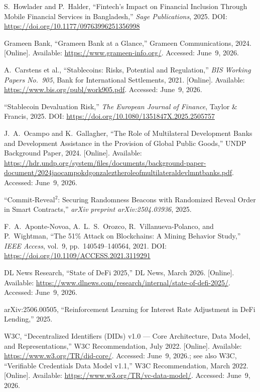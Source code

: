 \documentclass[12pt,a4paper]{report}
\begin{document}
{\begin{enumerate}[label={[\arabic*]}]
\item S.~Howlader and P.~Halder, ``Fintech's Impact on Financial Inclusion Through Mobile Financial Services in Bangladesh,'' \textit{Sage Publications}, 2025. DOI: \url{https://doi.org/10.1177/09763996251356998}

\item Grameen Bank, ``Grameen Bank at a Glance,'' Grameen Communications, 2024. [Online]. Available: \url{https://www.grameen-info.org/}. Accessed: June~9, 2026.
\item A.~Carstens et al., ``Stablecoins: Risks, Potential and Regulation,'' \textit{BIS Working Papers No.~905}, Bank for International Settlements, 2021. [Online]. Available: \url{https://www.bis.org/publ/work905.pdf}. Accessed: June~9, 2026.

\item ``Stablecoin Devaluation Risk,'' \textit{The European Journal of Finance}, Taylor \& Francis, 2025. DOI: \url{https://doi.org/10.1080/1351847X.2025.2505757}

\item J.~A.~Ocampo and K.~Gallagher, ``The Role of Multilateral Development Banks and Development Assistance in the Provision of Global Public Goods,'' UNDP Background Paper, 2024. [Online]. Available: \url{https://hdr.undp.org/system/files/documents/background-paper-document/2024jaocampokdgonzaleztheroleofmultilateraldevlmntbanks.pdf}. Accessed: June~9, 2026.

\item ``Commit-Reveal$^2$: Securing Randomness Beacons with Randomized Reveal Order in Smart Contracts,'' \textit{arXiv preprint arXiv:2504.03936}, 2025.

\item F.~A.~Aponte-Novoa, A.~L.~S.~Orozco, R.~Villanueva-Polanco, and P.~Wightman, ``The 51\% Attack on Blockchains: A Mining Behavior Study,'' \textit{IEEE Access}, vol.~9, pp.~140549--140564, 2021. DOI: \url{https://doi.org/10.1109/ACCESS.2021.3119291}
\item DL News Research, ``State of DeFi 2025,'' DL News, March 2026. [Online]. Available: \url{https://www.dlnews.com/research/internal/state-of-defi-2025/}. Accessed: June~9, 2026.
\item arXiv:2506.00505, ``Reinforcement Learning for Interest Rate Adjustment in DeFi Lending,'' 2025.


\item W3C, ``Decentralized Identifiers (DIDs) v1.0 --- Core Architecture, Data Model, and Representations,'' W3C Recommendation, July 2022. [Online]. Available: \url{https://www.w3.org/TR/did-core/}. Accessed: June~9, 2026.; see also W3C, ``Verifiable Credentials Data Model v1.1,'' W3C Recommendation, March 2022. [Online]. Available: \url{https://www.w3.org/TR/vc-data-model/}. Accessed: June~9, 2026.


\end{enumerate}}
\end{document}
